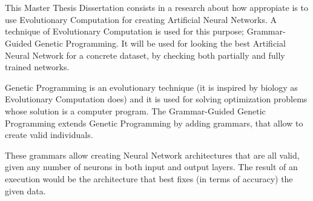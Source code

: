 \documentclass[spanish,a4paper,12pt,twoside]{report}
\begin{document}
  \chapter*{\vspace{-3cm}{\LARGE Summary}}
  \vspace{-1cm}
  This Master Thesis Dissertation consists in a research about how appropiate is to use Evolutionary Computation for creating Artificial Neural Networks. A technique of Evolutionary Computation is used for this purpose; Grammar-Guided Genetic Programming. It will be used for looking the best Artificial Neural Network for a concrete dataset, by checking both partially and fully trained networks. \par
  Genetic Programming is an evolutionary technique (it is inspired by biology as Evolutionary Computation does) and it is used for solving optimization problems whose solution is a computer program. The Grammar-Guided Genetic Programming extends Genetic Programming by adding grammars, that allow to create valid individuals. \par
  These grammars allow creating Neural Network architectures that are all valid, given any number of neurons in both input and output layers. The result of an execution would be the architecture that best fixes (in terms of accuracy) the given data.
  \vfill
  \newpage\cleardoublepage

  \renewcommand{\baselinestretch}{0.75}\normalsize
  \tableofcontents
  \renewcommand{\baselinestretch}{1.0}\normalsize
  
  \listoffigures
  \newpage
  \listoftables
  
  \newpage\cleardoublepage
  
\end{document}
